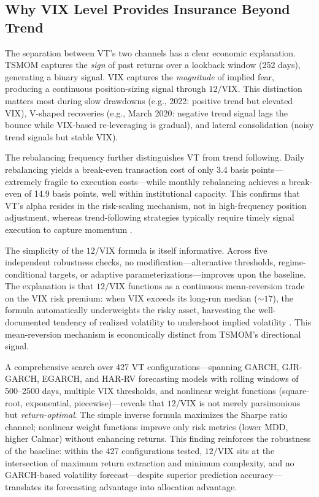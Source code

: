 \subsection{Why VIX Level Provides Insurance Beyond Trend}

The separation between VT's two channels has a clear economic explanation. TSMOM captures the \textit{sign} of past returns over a lookback window (252 days), generating a binary signal. VIX captures the \textit{magnitude} of implied fear, producing a continuous position-sizing signal through $12/\text{VIX}$. This distinction matters most during slow drawdowns (e.g., 2022: positive trend but elevated VIX), V-shaped recoveries (e.g., March 2020: negative trend signal lags the bounce while VIX-based re-leveraging is gradual), and lateral consolidation (noisy trend signals but stable VIX).

The rebalancing frequency further distinguishes VT from trend following. Daily rebalancing yields a break-even transaction cost of only 3.4 basis points---extremely fragile to execution costs---while monthly rebalancing achieves a break-even of 14.9 basis points, well within institutional capacity. This confirms that VT's alpha resides in the risk-scaling mechanism, not in high-frequency position adjustment, whereas trend-following strategies typically require timely signal execution to capture momentum \citep{moskowitz2012}.

The simplicity of the $12/\text{VIX}$ formula is itself informative. Across five independent robustness checks, no modification---alternative thresholds, regime-conditional targets, or adaptive parameterizations---improves upon the baseline. The explanation is that $12/\text{VIX}$ functions as a continuous mean-reversion trade on the VIX risk premium: when VIX exceeds its long-run median (${\sim}17$), the formula automatically underweights the risky asset, harvesting the well-documented tendency of realized volatility to undershoot implied volatility \citep{bozovic2024}. This mean-reversion mechanism is economically distinct from TSMOM's directional signal.

A comprehensive search over 427 VT configurations---spanning GARCH, GJR-GARCH, EGARCH, and HAR-RV forecasting models with rolling windows of 500--2500 days, multiple VIX thresholds, and nonlinear weight functions (square-root, exponential, piecewise)---reveals that $12/\text{VIX}$ is not merely parsimonious but \textit{return-optimal}. The simple inverse formula maximizes the Sharpe ratio channel; nonlinear weight functions improve only risk metrics (lower MDD, higher Calmar) without enhancing returns. This finding reinforces the robustness of the baseline: within the 427 configurations tested, $12/\text{VIX}$ sits at the intersection of maximum return extraction and minimum complexity, and no GARCH-based volatility forecast---despite superior prediction accuracy---translates its forecasting advantage into allocation advantage.

